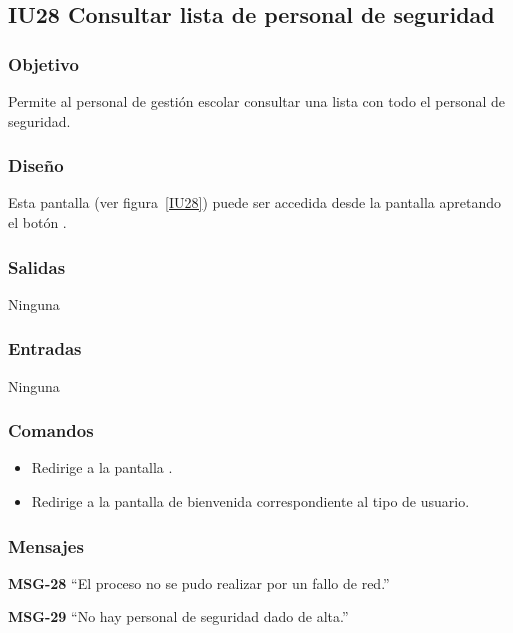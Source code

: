 
\subsection{IU28 Consultar lista de personal de seguridad}
\subsubsection{Objetivo}
   Permite al personal de gestión escolar consultar una lista con todo el personal de seguridad.
\subsubsection{Diseño}
    Esta pantalla  (ver figura~\ref{IU28}) puede ser accedida desde la pantalla  apretando el botón .

\subsubsection{Salidas}
Ninguna
\subsubsection{Entradas}
Ninguna
\subsubsection{Comandos}
\begin{itemize}
    \item {} Redirige a la pantalla .
    \item {} Redirige a la pantalla de bienvenida correspondiente al tipo de usuario.
    
\end{itemize}

\subsubsection{Mensajes}

\begin{Citemize}
    \item {\bf MSG-28}  ``El proceso no se pudo realizar por un fallo de red.''
    \item {\bf MSG-29}  ``No hay personal de seguridad dado de alta.''
    
\end{Citemize}


